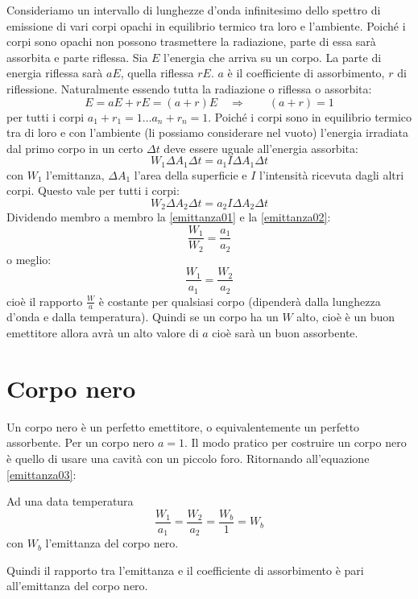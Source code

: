 Consideriamo un intervallo di lunghezze d'onda infinitesimo dello spettro di emissione di vari corpi opachi in equilibrio termico tra loro e l'ambiente. Poiché i corpi sono opachi non possono trasmettere la radiazione, parte di essa sarà assorbita e parte riflessa. Sia $E$ l'energia che arriva su un corpo. La parte di energia riflessa sarà $aE$, quella riflessa $rE$. $a$ è il coefficiente di assorbimento, $r$ di riflessione. Naturalmente essendo tutta la radiazione o riflessa o assorbita:
\begin{equation}
E=aE+rE=(a+r)E\quad\Rightarrow \qquad(a+r)=1
\end{equation}
per tutti i corpi $a_1+r_1=1\ldots a_n+r_n=1$. Poiché i corpi sono in equilibrio termico tra di loro e con l'ambiente (li possiamo considerare nel vuoto) l'energia irradiata dal primo corpo in un certo $\Delta t$ deve essere uguale all'energia assorbita:
\begin{equation}
W_1\Delta A_1\Delta t=a_1I\Delta A_1\Delta t
\label{emittanza01}
\end{equation}
con $W_1$ l'emittanza, $\Delta A_1$ l'area della superficie e $I$ l'intensità ricevuta dagli altri corpi. Questo vale per tutti i corpi:
\begin{equation}
W_2\Delta A_2\Delta t=a_2I\Delta A_2\Delta t
\label{emittanza02}
\end{equation}
Dividendo membro a membro la \eqref{emittanza01} e la \eqref{emittanza02}:
\begin{equation}
\frac{W_1}{W_2}=\frac{a_1}{a_2}
\end{equation}
o meglio:
\begin{equation}
\frac{W_1}{a_1}=\frac{W_2}{a_2}
\label{emittanza03}
\end{equation}
cioè il rapporto $\frac{W}{a}$ è costante per qualsiasi corpo (dipenderà dalla lunghezza d'onda e dalla temperatura). Quindi se un corpo ha un $W$ alto, cioè è un buon emettitore allora avrà un alto valore di $a$ cioè sarà un buon assorbente.
\section{Corpo nero}
Un corpo nero è un perfetto emettitore, o equivalentemente un perfetto assorbente. Per un corpo nero $a=1$. Il modo pratico per costruire un corpo nero è quello di usare una cavità con un piccolo foro. Ritornando all'equazione \eqref{emittanza03}:
\begin{legge}
Ad una data temperatura
\begin{equation}
\frac{W_1}{a_1}=\frac{W_2}{a_2}=\frac{W_b}{1}=W_b
\end{equation}
con $W_b$ l'emittanza del corpo nero.
\end{legge}
Quindi il rapporto tra l'emittanza e il coefficiente di assorbimento è pari all'emittanza del corpo nero.
